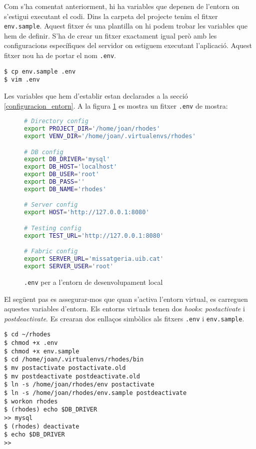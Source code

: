 Com s'ha comentat anteriorment, hi ha variables que depenen de l'entorn on s'estigui executant el codi. Dins la carpeta del projecte tenim el fitxer \texttt{env.sample}. Aquest fitxer és una plantilla on hi podem trobar les variables que hem de definir. S'ha de crear un fitxer exactament igual però amb les configuracions específiques del servidor on estiguem executant l'aplicació. Aquest fitxer nou ha de portar el nom \texttt{.env}.

\begin{verbatim}
$ cp env.sample .env
$ vim .env
\end{verbatim}

Les variables que hem d'establir estan declarades a la secció \ref{configuracion_entorn}. A la figura \ref{fig:env_sample} es mostra un fitxer \texttt{.env} de mostra:

\begin{figure}[h!]
	\begin{lstlisting}[language=bash]
# Directory config
export PROJECT_DIR='/home/joan/rhodes'
export VENV_DIR='/home/joan/.virtualenvs/rhodes'

# DB config
export DB_DRIVER='mysql'
export DB_HOST='localhost'
export DB_USER='root'
export DB_PASS=''
export DB_NAME='rhodes'

# Server config
export HOST='http://127.0.0.1:8080'

# Testing config
export TEST_URL='http://127.0.0.1:8080'

# Fabric config
export SERVER_URL='missatgeria.uib.cat'
export SERVER_USER='root'
	\end{lstlisting}
	\caption{\texttt{.env} per a l'entorn de desenvolupament local}
	\label{fig:env_sample}
\end{figure}

El següent pas es assegurar-mos que quan s'activa l'entorn virtual, es carreguen aquestes variables d'entorn. Els entorns virtuals tenen dos \emph{hooks}: \emph{postactivate} i \emph{postdeactivate}. Es crearan dos enllaços simbòlics als fitxers \texttt{.env} i \texttt{env.sample}.

\begin{verbatim}
$ cd ~/rhodes
$ chmod +x .env
$ chmod +x env.sample
$ cd /home/joan/.virtualenvs/rhodes/bin
$ mv postactivate postactivate.old
$ mv postdeactivate postdeactivate.old
$ ln -s /home/joan/rhodes/env postactivate
$ ln -s /home/joan/rhodes/env.sample postdeactivate
$ workon rhodes
$ (rhodes) echo $DB_DRIVER
>> mysql
$ (rhodes) deactivate
$ echo $DB_DRIVER
>>
\end{verbatim}

